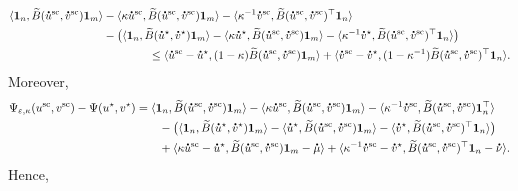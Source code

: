 \begin{align*}
\inr{\mathbf 1_n, \widetilde{B}(\dt{u}^{\text{sc}} ,\dt{v}^{\text{sc}})\mathbf 1_m} &- \inr{\kappa\dt{u}^{\text{sc}}, \widetilde{B}(\dt{u}^{\text{sc}} ,\dt{v}^{\text{sc}})\mathbf 1_m} - \inr{\kappa^{-1}\dt{v}^{\text{sc}}, \widetilde{B}(\dt{u}^{\text{sc}} ,\dt{v}^{\text{sc}})^\top\mathbf 1_n}\\
& - \big(\inr{\mathbf 1_n, \widetilde{B}(\dt{u}^{\star} ,\dt{v}^{\star})\mathbf 1_m}  
- \inr{\kappa\dt{u}^{\star{}}, \widetilde{B}(\dt{u}^{\text{sc}} ,\dt{v}^{\text{sc}})\mathbf 1_m} 
- \inr{\kappa^{-1}\dt{v}^\star, \widetilde{B}(\dt{u}^{\text{sc}} ,\dt{v}^{\text{sc}})^\top\mathbf 1_n} \big)\\
&\qquad \qquad  \leq \inr{\dt{u}^{\text{sc}} - \dt{u}^\star, (1-\kappa) \widetilde{B}(\dt{u}^{\text{sc}} ,\dt{v}^{\text{sc}})\mathbf 1_m} 
+ \inr{\dt{v}^{\text{sc}} - \dt{v}^\star, (1-\kappa^{-1}) \widetilde{B}(\dt{u}^{\text{sc}} ,\dt{v}^{\text{sc}})^\top\mathbf 1_n}.
\end{align*}
Moreover,
\begin{align*}
\Psi_{\varepsilon, \kappa} (u^{\text{sc}} ,v^{\text{sc}}) -\Psi(u^\star, v^\star)
&= \inr{\mathbf 1_n, \widetilde{B}(\dt{u}^{\text{sc}} ,\dt{v}^{\text{sc}})\mathbf 1_m} - \inr{\kappa\dt{u}^{\text{sc}}, \widetilde{B}(\dt{u}^{\text{sc}} ,\dt{v}^{\text{sc}})\mathbf 1_m} - \inr{\kappa^{-1}\dt{v}^{\text{sc}}, \widetilde{B}(\dt{u}^{\text{sc}}, \dt{v}^{\text{sc}})\mathbf 1_n^\top}\\
&\qquad - \big( 
\inr{\mathbf 1_n, \widetilde{B}(\dt{u}^{\star} ,\dt{v}^{\star})\mathbf 1_m}  
- \inr{\dt{u}^{\star{}}, \widetilde{B}(\dt{u}^{\text{sc}} ,\dt{v}^{\text{sc}})\mathbf 1_m} 
- \inr{\dt{v}^\star, \widetilde{B}(\dt{u}^{\text{sc}} ,\dt{v}^{\text{sc}})^\top\mathbf 1_n} \big)\\
&\qquad + \inr{\kappa \dt{u}^{\text{sc}} - \dt{u}^{\star}, \widetilde{B}(\dt{u}^{\text{sc}} ,\dt{v}^{\text{sc}})\mathbf 1_m - \dt{\mu}} + \inr{\kappa^{-1}\dt{v}^{\text{sc}} - \dt{v}^{\star}, \widetilde{B}(\dt{u}^{\text{sc}} ,\dt{v}^{\text{sc}})^\top\mathbf 1_n - \dt{\nu}}.
\end{align*}
Hence,
